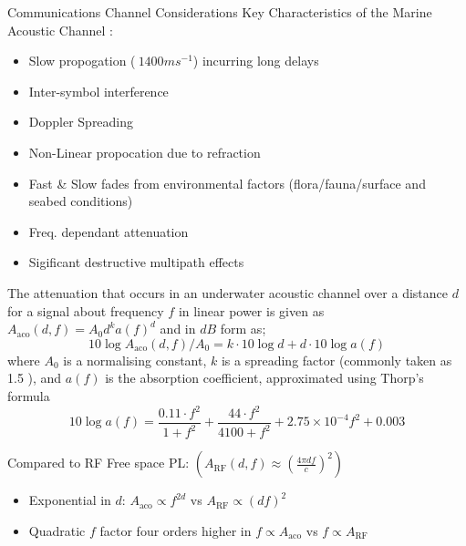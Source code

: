\documentclass{beamer}
\begin{document}
\begin{frame}[allowframebreaks]{Communications Channel Considerations}
  Key Characteristics of the Marine Acoustic Channel \cite{Urick1983,Partan2006,Stojanovic2007,Stefanov2011}:
  \begin{itemize}
    \item Slow propogation ($~1400ms^{-1}$) incurring long delays
    \item Inter-symbol interference
    \item Doppler Spreading
    \item Non-Linear propocation due to refraction
    \item Fast \& Slow fades from environmental factors (flora/fauna/surface and seabed conditions)
    \item Freq. dependant attenuation
    \item Sigificant destructive multipath effects
  \end{itemize}
  
  \framebreak

  The attenuation that occurs in an underwater acoustic channel over a distance $d$ for a signal about frequency $f$ in linear power is given as $A_{\text{aco}}(d,f) = A_0d^ka(f)^d$ and in $dB$ form as;
  \begin{equation}
    \label{eq:acoattenuationdb}
    10 \log A_{\text{aco}}(d,f)/A_0 = k \cdot 10 \log d + d \cdot 10 \log a(f)
  \end{equation}
  where $A_0$ is a normalising constant, $k$ is a spreading factor (commonly taken as 1.5  \cite{Stojanovic2007}), and $a(f)$ is the absorption coefficient, approximated using Thorp's formula \cite{Stefanov2011}
  \begin{equation}
    \label{eq:thorp}
    10 \log a(f) = \frac{0.11 \cdot f^2}{1+f^2} + \frac{44\cdot f^2}{4100+f^2}+ 2.75\times10^{-4} f^2 + 0.003
  \end{equation}

  \framebreak

  Compared to RF Free space PL: $(A_{\text{RF}}(d,f) \approx \left( \frac{4\pi d f}{c} \right)^2)$
  \begin{itemize}
    \item Exponential in $d$: $A_{\text{aco}} \propto f^{2d}$ vs $A_{\text{RF}} \propto (df)^2$
    \item Quadratic $f$ factor four orders higher in $f\propto A_{\text{aco}}$ vs $f\propto A_{\text{RF}}$

  \end{itemize}
  
\end{frame}
\end{document}
